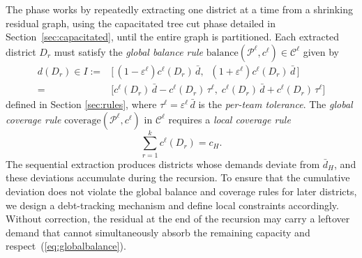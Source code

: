 \documentclass[11pt]{article}
\theoremstyle{definition}
\begin{document}
The phase works by repeatedly extracting one district at a time from a shrinking residual graph, using the capacitated tree cut phase detailed in Section~\ref{sec:capacitated}, until the entire graph is partitioned. Each extracted district $D_r$ must satisfy the \emph{global balance rule} $\mathrm{balance}(\mathcal{P}^\ell, c^\ell) \in \mathcal{C}^\ell$ given by
%
\begin{align}\label{eq:globalbalance}
    d(D_r) \in I
    :=& \bigl[\, (1 - \varepsilon^{\ell}) c^{\ell}(D_r)\,\bar{d}, \;\;
                      (1 + \varepsilon^{\ell}) c^{\ell}(D_r)\,\bar{d} \,\bigr] \\[4pt]
    =& \bigl[ c^{\ell}(D_r)\,\bar{d} - c^{\ell}(D_r)\,\tau^\ell,\; c^{\ell}(D_r)\,\bar{d} + c^{\ell}(D_r)\,\tau^\ell  \bigr]
\end{align}
%
\begingroup\sloppy
defined in Section \ref{sec:rules}, where $\tau^\ell = \varepsilon^{\ell}\,\bar{d}$ is the \emph{per-team tolerance}. The \emph{global coverage rule} $\mathrm{coverage}(\mathcal{P}^\ell, c^\ell)$ in $\mathcal{C}^{\ell}$ requires a \emph{local coverage rule}
%
\begin{equation}\label{eq:localcoverage}
\sum_{r=1}^{k} c^{\ell}(D_r) = c_H.
\end{equation}
%
The sequential extraction produces districts whose demands deviate from $\bar{d}_H$, and these deviations accumulate during the recursion. To ensure that the cumulative deviation does not violate the global balance and coverage rules for later districts, we design a debt-tracking mechanism and define local constraints accordingly. Without correction, the residual at the end of the recursion may carry a leftover demand that cannot simultaneously absorb the remaining capacity and respect~(\ref{eq:globalbalance}).
\endgroup
\end{document}
